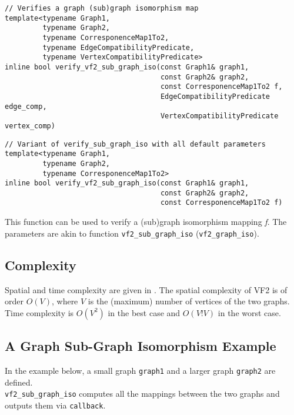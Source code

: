 \documentclass[12pt]{article}
\begin{document}
\begin{lstlisting}
// Verifies a graph (sub)graph isomorphism map 
template<typename Graph1,
         typename Graph2,
         typename CorresponenceMap1To2,
         typename EdgeCompatibilityPredicate,
         typename VertexCompatibilityPredicate>
inline bool verify_vf2_sub_graph_iso(const Graph1& graph1,
                                     const Graph2& graph2, 
                                     const CorresponenceMap1To2 f,
                                     EdgeCompatibilityPredicate edge_comp, 
                                     VertexCompatibilityPredicate vertex_comp)
\end{lstlisting}


\begin{lstlisting}
// Variant of verify_sub_graph_iso with all default parameters
template<typename Graph1,
         typename Graph2,
         typename CorresponenceMap1To2>
inline bool verify_vf2_sub_graph_iso(const Graph1& graph1,
                                     const Graph2& graph2, 
                                     const CorresponenceMap1To2 f)
\end{lstlisting}

This function can be used to verify a (sub)graph isomorphism mapping {\em f}.
The parameters are akin to function \verb+vf2_sub_graph_iso+
(\verb+vf2_graph_iso+).


\subsection{Complexity}

Spatial and time complexity are given in \cite{cordella+2004}. The spatial
complexity of {\sc VF2} is of order $O(V)$, where $V$ is the (maximum) number
of vertices of the two graphs. Time complexity is $O(V^2)$ in the best case and
$O(V!V)$ in the worst case.

\subsection{A Graph Sub-Graph Isomorphism Example}

In the example below, a small graph \verb+graph1+ and a larger graph
\verb+graph2+ are defined. \\ \verb+vf2_sub_graph_iso+ computes all the
mappings between the two graphs and outputs them via \verb+callback+.
\end{document}
